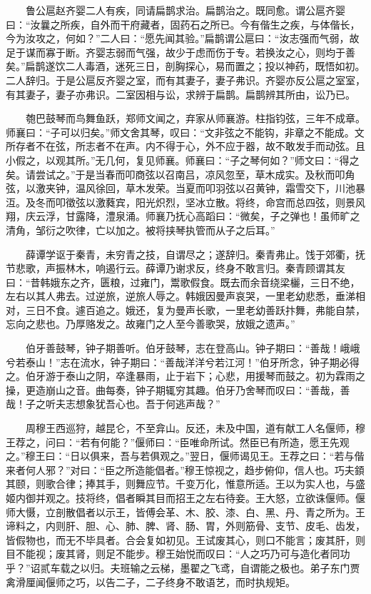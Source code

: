 　　鲁公扈赵齐婴二人有疾，同请扁鹊求治。扁鹊治之。既同愈。谓公扈齐婴曰：``汝曩之所疾，自外而干府藏者，固药石之所已。今有偕生之疾，与体偕长，今为汝攻之，何如？''二人曰：``愿先闻其验。''扁鹊谓公扈曰：``汝志强而气弱，故足于谋而寡于断。齐婴志弱而气强，故少于虑而伤于专。若换汝之心，则均于善矣。''扁鹊遂饮二人毒酒，迷死三日，剖胸探心，易而置之；投以神药，既悟如初。二人辞归。于是公扈反齐婴之室，而有其妻子，妻子弗识。齐婴亦反公扈之室室，有其妻子，妻子亦弗识。二室因相与讼，求辨于扁鹊。扁鹊辨其所由，讼乃已。

　　匏巴鼓琴而鸟舞鱼跃，郑师文闻之，弃家从师襄游。柱指钧弦，三年不成章。师襄曰：``子可以归矣。''师文舍其琴，叹曰：``文非弦之不能钩，非章之不能成。文所存者不在弦，所志者不在声。内不得于心，外不应于器，故不敢发手而动弦。且小假之，以观其所。''无几何，复见师襄。师襄曰：``子之琴何如？''师文曰：``得之矣。请尝试之。''于是当春而叩商弦以召南吕，凉风忽至，草木成实。及秋而叩角弦，以激夹钟，温风徐回，草木发荣。当夏而叩羽弦以召黄钟，霜雪交下，川池暴沍。及冬而叩徵弦以激蕤宾，阳光炽烈，坚冰立散。将终，命宫而总四弦，则景风翔，庆云浮，甘露降，澧泉涌。师襄乃抚心高蹈曰：``微矣，子之弹也！虽师旷之清角，邹衍之吹律，亡以加之。被将挟琴执管而从子之后耳。''

　　薛谭学讴于秦青，未穷青之技，自谓尽之；遂辞归。秦青弗止。饯于郊衢，抚节悲歌，声振林木，响遏行云。薛谭乃谢求反，终身不敢言归。秦青顾谓其友曰：``昔韩娥东之齐，匮粮，过雍门，鬻歌假食。既去而余音绕梁欐，三日不绝，左右以其人弗去。过逆旅，逆旅人辱之。韩娥因曼声哀哭，一里老幼悲悉，垂涕相对，三日不食。遽百追之。娥还，复为曼声长歌，一里老幼善跃抃舞，弗能自禁，忘向之悲也。乃厚赂发之。故雍门之人至今善歌哭，放娥之遗声。''

　　伯牙善鼓琴，钟子期善听。伯牙鼓琴，志在登高山。钟子期曰：``善哉！峨峨兮若泰山！''志在流水，钟子期曰：``善哉洋洋兮若江河！''伯牙所念，钟子期必得之。伯牙游于泰山之阴，卒逢暴雨，止于岩下；心悲，用援琴而鼓之。初为霖雨之操，更造崩山之音。曲每奏，钟子期辄穷其趣。伯牙乃舍琴而叹曰：``善哉，善哉！子之听夫志想象犹吾心也。吾于何逃声哉？''

　　周穆王西巡狩，越昆仑，不至弇山。反还，未及中国，道有献工人名偃师，穆王荐之，问曰：``若有何能？''偃师曰：``臣唯命所试。然臣已有所造，愿王先观之。''穆王曰：``日以俱来，吾与若俱观之。''翌日，偃师谒见王。王荐之曰：``若与偕来者何人邪？''对曰：``臣之所造能倡者。''穆王惊视之，趋步俯仰，信人也。巧夫顉其颐，则歌合律；捧其手，则舞应节。千变万化，惟意所适。王以为实人也，与盛姬内御并观之。技将终，倡者瞬其目而招王之左右待妾。王大怒，立欲诛偃师。偃师大慑，立剖散倡者以示王，皆傅会革、木、胶、漆、白、黑、丹、青之所为。王谛料之，内则肝、胆、心、肺、脾、肾、肠、胃，外则筋骨、支节、皮毛、齿发，皆假物也，而无不毕具者。合会复如初见。王试废其心，则口不能言；废其肝，则目不能视；废其肾，则足不能步。穆王始悦而叹曰：``人之巧乃可与造化者同功乎？''诏贰车载之以归。夫班输之云梯，墨翟之飞鸢，自谓能之极也。弟子东门贾禽滑厘闻偃师之巧，以告二子，二子终身不敢语艺，而时执规矩。

